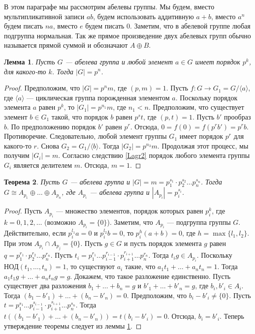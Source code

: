 \documentclass[12pt, titlepage, oneside]{amsbook}
\newtheorem{theorem}{Теорема}[chapter]
\newtheorem{lemma}[theorem]{Лемма}
\theoremstyle{definition}
\theoremstyle{remark}
\begin{document}
В этом параграфе мы рассмотрим абелевы группы. Мы будем, вместо
мультипликативной записи $ab$, будем использовать аддитивную $a+b$,
вместо $a^n$ будем писать $na$, вместо $e$ будем писать $0$.
Заметим, что в абелевой группе любая подгруппа нормальная. Так же
прямое произведение двух абелевых групп обычно называется прямой
суммой и обозначают $A\oplus B$.

\begin{lemma}
	\label{AbGrL} Пусть $G$ --- абелева группа и любой элемент $a\in G$
	имеет порядок $p^k$, для какого-то $k$. Тогда $|G|=p^n$.
\end{lemma}

\begin{proof}
	Предположим, что $|G|=p^nm$, где $(p,m)=1$. Пусть $f\colon
		G\rightarrow G_1=G/\langle a\rangle$, где $\langle a\rangle$ ---
	циклическая группа порожденная элементом $a$. Поскольку порядок
	элемента $a$ равен $p^k$, то $|G_1|=p^{n_{1}}m$, где $n_{1}<n$.
	Предположим, что существует элемент $b\in G_1$ такой, что порядок
	$b$ равен $p^st$, где $(p,t)=1$. Пусть $b'$ прообраз $b$. По
	предположению порядок $b'$ равен $p^r$. Отсюда,
	$0=f(0)=f(p^rb')=p^rb$. Противоречие. Следовательно, любой элемент
	группы $G_1$ имеет порядок $p^r$ для какого-то $r$. Снова
	$G_2=G_1/\langle b\rangle$. Тогда $|G_2|=p^{n_3}m$. Продолжая этот
	процесс, мы получим $|G_i|=m$. Согласно следствию \ref{Lagr2}
	порядок любого элемента группы $G_i$ является делителем $m$. Отсюда,
	$m=1$.
\end{proof}

\begin{theorem}
	\label{AbGr1} Пусть $G$ --- абелева группа и
	$|G|=m=p_{1}^{s_{1}}\cdot p_{2}^{s_{2}}\dots p_{n}^{s_{n}}$. Тогда
	$G\cong A_{p_{1}}\oplus\dots\oplus A_{p_{n}}$, где $A_{p_{i}}$ ---
	абелева группа и $|A_{p_{i}}|=p_{i}^{s_{i}}$.
\end{theorem}

\begin{proof}
	Пусть $A_{p_{i}}$ --- множество элементов, порядок которых равен
	$p_{i}^k$, где $k=0,1,2,\dots$ (возможно $A_{p_{i}}=\{0\}$).
	Заметим, что $A_{p_{i}}$ --- подгруппа группы $G$. Действительно,
	если $p_{i}^{l_{1}}a=0$ и $p_{i}^{l_{2}}b=0$, то $p_{i}^h(a+b)=0$,
	где $h=\max\{l_{1},l_{2}\}$. При этом $A_{p_{i}}\cap
		A_{p_{j}}=\{0\}$. Пусть $g\in G$ и пусть порядок элемента $g$ равен
	$q=p_{1}^{r_{1}}\cdot p_{2}^{r_{2}}\dots p_{n}^{r_{n}}$. Пусть
	$t_{i}=p_{1}^{r_{1}}\dots p_{i-1}^{r_{i-1}}\cdot
		p_{i+1}^{r_{i+1}}\dots p_{n}^{r_{n}}$. Тогда $t_{i}g \in A_{p_{i}}$.
	Поскольку $НОД(t_{1},\dots,t_{n})=1$, то существуют $a_{i}$ такие,
	что $a_{1}t_{1}+\dots+a_{n}t_{n}=1$. Тогда
	$a_{1}t_{1}g+\dots+a_{n}t_{n}g=g$. Докажем, что такое разложение
	единственно. Пусть существует два разложения $b_{1}+\dots+b_{n}=g$ и
	$b'_{1}+\dots+b'_{n}=g$, где $b_{i},b'_{i}\in A_{i}$. Тогда
	$(b_{1}-b'_{1})+\dots+(b_{n}-b'_{n})=0$. Предположим, что
	$b_{i}-b'_{i}\neq\{0\}$. Пусть $t=p_{1}^{s_{1}}\dots
		p_{i-1}^{s_{i-1}}\cdot p_{i+1}^{s_{i+1}}\dots p_{n}^{s_{n}}$. Тогда
	$t((b_{1}-b'_{1})+\dots+(b_{n}-b'_{n}))=t(b_{i}-b'_{i})=0$. Отсюда,
	$b_{i}=b'_{i}$. Теперь утверждение теоремы следует из леммы
	\ref{AbGrL}.
\end{proof}
\end{document}

